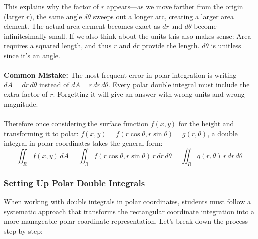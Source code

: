 \noindent This explains why the factor of $r$ appears—as we move farther from the origin (larger $r$), the same angle $d\theta$ sweeps out a longer arc, creating a larger area element. The actual area element becomes exact as $dr$ and $d\theta$ become infinitesimally small. If we also think about the units this also makes sense: Area requires a squared length, and thus $r$ and $dr$ provide the length. $d\theta$ is unitless since it's an angle. \\ \\
\noindent \textbf{Common Mistake:} The most frequent error in polar integration is writing \( dA = dr \, d\theta \) instead of \( dA = r \, dr \, d\theta \). Every polar double integral must include the extra factor of \( r \). Forgetting it will give an answer with wrong units and wrong magnitude.\\ \\

\noindent Therefore once considering the surface function $f(x,y)$ for the height and transforming it to polar: $f(x,y) = f(r\cos\theta,r\sin\theta) = g(r,\theta)$, a double integral in polar coordinates takes the general form:
\[
\iint_R f(x,y)\,dA = \iint_R f(r\cos\theta, r\sin\theta)\,r\,dr\,d\theta =  \iint_R g(r,\theta)\,r\,dr\,d\theta 
\]

\subsubsection*{Setting Up Polar Double Integrals}

\noindent When working with double integrals in polar coordinates, students must follow a systematic approach that transforms the rectangular coordinate integration into a more manageable polar coordinate representation. Let's break down the process step by step:

